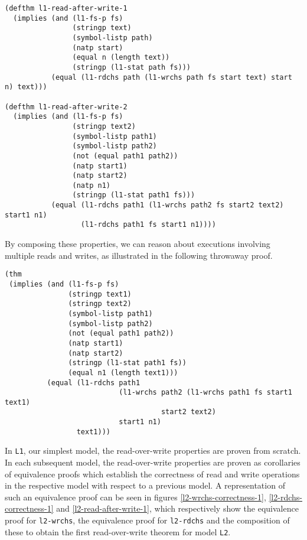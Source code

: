 \documentclass[submission,copyright,creativecommons]{eptcs}
\begin{document}
\bigskip

\noindent
\begin{verbatim}
(defthm l1-read-after-write-1
  (implies (and (l1-fs-p fs)
                (stringp text)
                (symbol-listp path)
                (natp start)
                (equal n (length text))
                (stringp (l1-stat path fs)))
           (equal (l1-rdchs path (l1-wrchs path fs start text) start n) text)))

(defthm l1-read-after-write-2
  (implies (and (l1-fs-p fs)
                (stringp text2)
                (symbol-listp path1)
                (symbol-listp path2)
                (not (equal path1 path2))
                (natp start1)
                (natp start2)
                (natp n1)
                (stringp (l1-stat path1 fs)))
           (equal (l1-rdchs path1 (l1-wrchs path2 fs start2 text2) start1 n1)
                  (l1-rdchs path1 fs start1 n1))))
\end{verbatim}

By composing these properties, we can reason about executions
involving multiple reads and writes, as illustrated in the following
throwaway proof.

\medskip

\noindent
\begin{verbatim}
(thm
 (implies (and (l1-fs-p fs)
               (stringp text1)
               (stringp text2)
               (symbol-listp path1)
               (symbol-listp path2)
               (not (equal path1 path2))
               (natp start1)
               (natp start2)
               (stringp (l1-stat path1 fs))
               (equal n1 (length text1)))
          (equal (l1-rdchs path1
                           (l1-wrchs path2 (l1-wrchs path1 fs start1 text1)
                                     start2 text2)
                           start1 n1)
                 text1)))
\end{verbatim}

In \texttt{L1}, our simplest model, the read-over-write properties
are proven from scratch. In each subsequent model, the read-over-write
properties are proven as corollaries of equivalence proofs which
establish the correctness of read and write operations in the
respective model with respect to a previous model. A representation of
such an equivalence proof can be seen in figures
\ref{l2-wrchs-correctness-1}, \ref{l2-rdchs-correctness-1} and
\ref{l2-read-after-write-1}, which respectively show the equivalence
proof for \texttt{l2-wrchs}, the equivalence proof for
\texttt{l2-rdchs} and the composition of these to obtain the first
read-over-write theorem for model \texttt{L2}.
\end{document}
